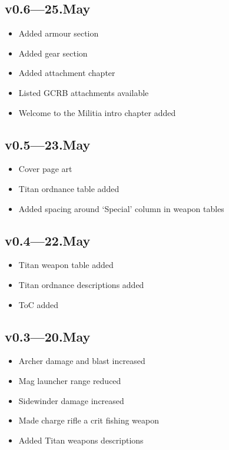 \documentclass[9pt, openany]{extbook}
\begin{document}
{\subsection{v0.6---25.May}
\begin{itemize}[noitemsep]
\item Added armour section
\item Added gear section
\item Added attachment chapter
\item Listed GCRB attachments available
\item Welcome to the Militia intro chapter added
\end{itemize}

\subsection{v0.5---23.May}
\begin{itemize}[noitemsep]
\item Cover page art
\item Titan ordnance table added
\item Added spacing around `Special' column in weapon tables
\end{itemize}

\subsection{v0.4---22.May}
\begin{itemize}[noitemsep]
\item Titan weapon table added
\item Titan ordnance descriptions added
\item ToC added
\end{itemize}


\subsection{v0.3---20.May}
\begin{itemize}[noitemsep]
\item Archer damage and blast increased
\item Mag launcher range reduced
\item Sidewinder damage increased
\item Made charge rifle a crit fishing weapon
\item Added Titan weapons descriptions
\end{itemize}


}
\end{document}
